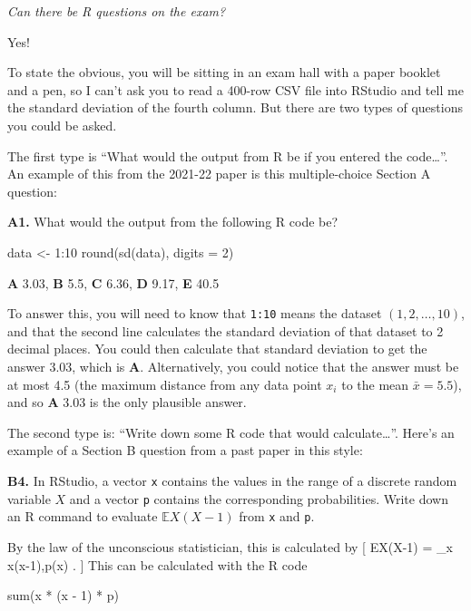 \documentclass[
  letterpaper,
  DIV=11,
  numbers=noendperiod]{scrreprt}
\newenvironment{Shaded}{\begin{snugshade}}{\end{snugshade}}
\newcommand{\AttributeTok}[1]{\textcolor[rgb]{0.40,0.45,0.13}{#1}}
\newcommand{\DecValTok}[1]{\textcolor[rgb]{0.68,0.00,0.00}{#1}}
\newcommand{\FunctionTok}[1]{\textcolor[rgb]{0.28,0.35,0.67}{#1}}
\newcommand{\NormalTok}[1]{\textcolor[rgb]{0.00,0.23,0.31}{#1}}
\newcommand{\OtherTok}[1]{\textcolor[rgb]{0.00,0.23,0.31}{#1}}
\newcommand{\SpecialCharTok}[1]{\textcolor[rgb]{0.37,0.37,0.37}{#1}}
\theoremstyle{remark}
\begin{document}
\emph{Can there be R questions on the exam?}

Yes!

To state the obvious, you will be sitting in an exam hall with a paper
booklet and a pen, so I can't ask you to read a 400-row CSV file into
RStudio and tell me the standard deviation of the fourth column. But
there are two types of questions you could be asked.

The first type is ``What would the output from R be if you entered the
code\ldots{}''. An example of this from the 2021-22 paper is this
multiple-choice Section A question:

\textbf{A1.} What would the output from the following R code be?

\begin{Shaded}
\begin{Highlighting}[]
\NormalTok{data }\OtherTok{\textless{}{-}} \DecValTok{1}\SpecialCharTok{:}\DecValTok{10}
\FunctionTok{round}\NormalTok{(}\FunctionTok{sd}\NormalTok{(data), }\AttributeTok{digits =} \DecValTok{2}\NormalTok{)}
\end{Highlighting}
\end{Shaded}

\textbf{A} 3.03, \textbf{B} 5.5, \textbf{C} 6.36, \textbf{D} 9.17,
\textbf{E} 40.5

To answer this, you will need to know that \texttt{1:10} means the
dataset \((1, 2, \dots, 10)\), and that the second line calculates the
standard deviation of that dataset to 2 decimal places. You could then
calculate that standard deviation to get the answer 3.03, which is
\textbf{A}. Alternatively, you could notice that the answer must be at
most 4.5 (the maximum distance from any data point \(x_i\) to the mean
\(\bar x = 5.5\)), and so \textbf{A} 3.03 is the only plausible answer.

The second type is: ``Write down some R code that would
calculate\ldots{}''. Here's an example of a Section B question from a
past paper in this style:

\textbf{B4.} In RStudio, a vector \texttt{x} contains the values in the
range of a discrete random variable \(X\) and a vector \texttt{p}
contains the corresponding probabilities. Write down an R command to
evaluate \(\mathbb EX(X-1)\) from \texttt{x} and \texttt{p}.

By the law of the unconscious statistician, this is calculated by {[}
\mathbb EX(X-1) = \sum\_x x(x-1),p(x) . {]} This can be calculated with
the R code

\begin{Shaded}
\begin{Highlighting}[]
\FunctionTok{sum}\NormalTok{(x }\SpecialCharTok{*}\NormalTok{ (x }\SpecialCharTok{{-}} \DecValTok{1}\NormalTok{) }\SpecialCharTok{*}\NormalTok{ p)}
\end{Highlighting}
\end{Shaded}
\end{document}
